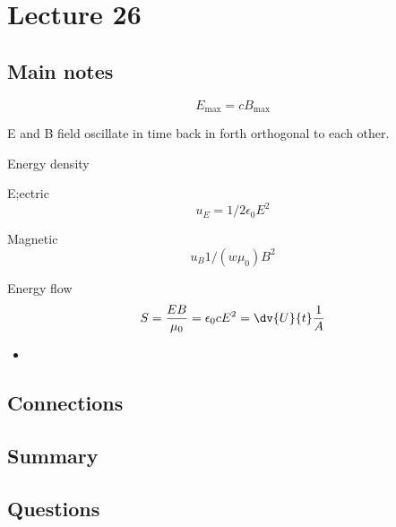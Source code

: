 \section{Lecture 26}
\subsection{Main notes}
\[
E_{\text{max}} = cB_{\text{max}}
  \]

  E and B field oscillate in time back in forth orthogonal to each other.

  Energy density

  E;ectric
\[
u_E= 1/2 \epsilon_0 E^2
  \]

  Magnetic
\[
u_B 1/(w\mu_0) B^2
  \]

  Energy flow
\[
S = \frac{EB}{\mu_0} = \epsilon_0 c E^2 = \dv{U}{t} \frac{1}{A}
  \]

\begin{itemize}
	\item
\end{itemize}


\subsection{Connections}


\subsection{Summary}


\subsection{Questions}
